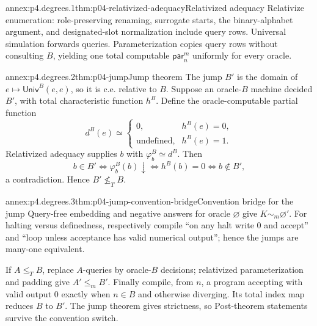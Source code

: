 
\begin{annexitem}{annex:p4.degrees.1}{thm:p04-relativized-adequacy}{Relativized adequacy}
Relativize enumeration: role-preserving renaming, surrogate starts, the
binary-alphabet argument, and designated-slot normalization include query
rows.  Universal simulation forwards queries.  Parameterization copies query
rows without consulting \(B\), yielding one total computable
\(\mathsf{par}_n^m\) uniformly for every oracle.
\end{annexitem}

\begin{annexitem}{annex:p4.degrees.2}{thm:p04-jump}{Jump theorem}
\enlargethispage{4\baselineskip}
The jump \(B'\) is the domain of \(e\mapsto\mathsf{Univ}^B(e,e)\), so it is c.e.
relative to \(B\).  Suppose an oracle-\(B\) machine decided \(B'\), with
total characteristic function \(h^B\).  Define the oracle-computable partial
function
\[
 d^B(e)\simeq
 \begin{cases}
  0,&h^B(e)=0,\\
  \text{undefined},&h^B(e)=1.
 \end{cases}
\]
Relativized adequacy supplies \(b\) with \(\varphi^B_b\simeq d^B\).  Then
\[
 b\in B'
 \Leftrightarrow \varphi^B_b(b)\downarrow
 \Leftrightarrow h^B(b)=0
 \Leftrightarrow b\notin B',
\]
a contradiction.  Hence \(B'\not\leq_TB\).
\end{annexitem}

\begin{annexitem}{annex:p4.degrees.3}{thm:p04-jump-convention-bridge}{Convention bridge for the jump}
Query-free embedding and negative answers for oracle \(\varnothing\) give
\(K\sim_m\varnothing'\).  For halting versus definedness, respectively compile
``on any halt write \(0\) and accept'' and ``loop unless acceptance has valid
numerical output''; hence the jumps are many-one equivalent.

If \(A\leq_TB\), replace \(A\)-queries by oracle-\(B\) decisions; relativized
parameterization and padding give \(A'\leq_mB'\).  Finally compile, from \(n\),
a program accepting with valid output \(0\) exactly when \(n\in B\) and
otherwise diverging.  Its total index map reduces \(B\) to \(B'\).  The jump
theorem gives strictness, so Post-theorem statements survive the convention
switch.
\end{annexitem}

